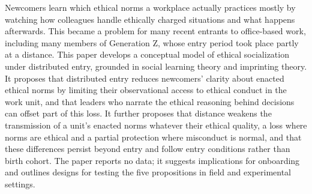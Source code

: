Newcomers learn which ethical norms a workplace actually practices mostly by watching how colleagues handle ethically charged situations and what happens afterwards. This became a problem for many recent entrants to office-based work, including many members of Generation Z, whose entry period took place partly at a distance. This paper develops a conceptual model of ethical socialization under distributed entry, grounded in social learning theory and imprinting theory. It proposes that distributed entry reduces newcomers' clarity about enacted ethical norms by limiting their observational access to ethical conduct in the work unit, and that leaders who narrate the ethical reasoning behind decisions can offset part of this loss. It further proposes that distance weakens the transmission of a unit's enacted norms whatever their ethical quality, a loss where norms are ethical and a partial protection where misconduct is normal, and that these differences persist beyond entry and follow entry conditions rather than birth cohort. The paper reports no data; it suggests implications for onboarding and outlines designs for testing the five propositions in field and experimental settings.
